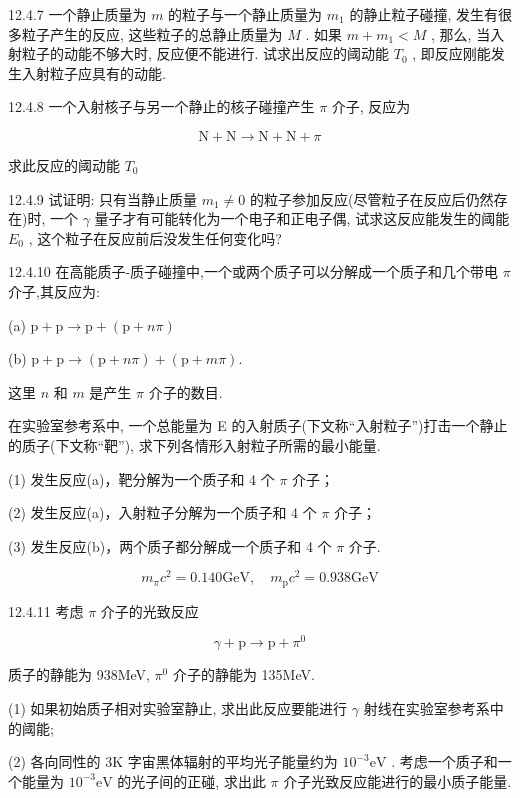 \begin{problem}{12.4.7}
一个静止质量为 $m$ 的粒子与一个静止质量为 $m_{1}$ 的静止粒子碰撞, 发生有很多粒子产生的反应, 这些粒子的总静止质量为 $M$ . 如果 $m + m_{1} < M$ , 那么, 当入射粒子的动能不够大时, 反应便不能进行. 试求出反应的阈动能 $T_{0}$ , 即反应刚能发生入射粒子应具有的动能.
\end{problem}
\clearpage


\begin{problem}{12.4.8}
一个入射核子与另一个静止的核子碰撞产生 $\pi$ 介子, 反应为

\[
\mathrm{N} + \mathrm{N} \rightarrow \mathrm{N} + \mathrm{N} + \pi
\]

求此反应的阈动能 $T_{0}$
\end{problem}
\clearpage


\begin{problem}{12.4.9}
试证明: 只有当静止质量 $m_{1} \neq 0$ 的粒子参加反应(尽管粒子在反应后仍然存在)时, 一个 $\gamma$ 量子才有可能转化为一个电子和正电子偶, 试求这反应能发生的阈能 $E_{0}$ , 这个粒子在反应前后没发生任何变化吗?
\end{problem}
\clearpage


\begin{problem}{12.4.10}
在高能质子-质子碰撞中,一个或两个质子可以分解成一个质子和几个带电 $\pi$ 介子,其反应为:

(a) $\mathrm{p} + \mathrm{p}\rightarrow \mathrm{p} + (\mathrm{p} + n\pi)$ 

(b) $\mathrm{p} + \mathrm{p}\rightarrow (\mathrm{p} + n\pi) + (\mathrm{p} + m\pi).$ 

这里 $n$ 和 $m$ 是产生 $\pi$ 介子的数目.

在实验室参考系中, 一个总能量为 E 的入射质子(下文称“入射粒子”)打击一个静止的质子(下文称“靶”), 求下列各情形入射粒子所需的最小能量.

(1) 发生反应(a)，靶分解为一个质子和 4 个 $\pi$ 介子；

(2) 发生反应(a)，入射粒子分解为一个质子和 4 个 $\pi$ 介子；

(3) 发生反应(b)，两个质子都分解成一个质子和 4 个 $\pi$ 介子.

\[
m _ {\pi} c ^ {2} = 0. 1 4 0 \mathrm{GeV}, \quad m _ {\mathrm{p}} c ^ {2} = 0. 9 3 8 \mathrm{GeV}
\]
\end{problem}
\clearpage


\begin{problem}{12.4.11}
考虑 $\pi$ 介子的光致反应

\[
\gamma + \mathrm{p} \rightarrow \mathrm{p} + \pi^ {0}
\]

质子的静能为 938MeV, $\pi^{0}$ 介子的静能为 135MeV.

(1) 如果初始质子相对实验室静止, 求出此反应要能进行 $\gamma$ 射线在实验室参考系中的阈能;

(2) 各向同性的 3K 字宙黑体辐射的平均光子能量约为 $10^{-3}\mathrm{eV}$ . 考虑一个质子和一个能量为 $10^{-3}\mathrm{eV}$ 的光子间的正碰, 求出此 $\pi$ 介子光致反应能进行的最小质子能量.
\end{problem}
\clearpage


